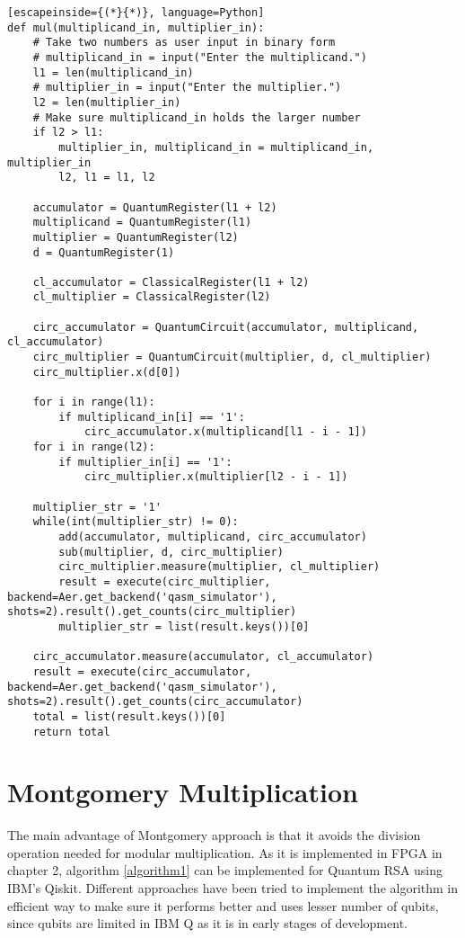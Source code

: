 \documentclass{cpp}
\begin{document}
\newpage
\begin{lstlisting}[escapeinside={(*}{*)}, language=Python]
def mul(multiplicand_in, multiplier_in):
    # Take two numbers as user input in binary form
    # multiplicand_in = input("Enter the multiplicand.")
    l1 = len(multiplicand_in)
    # multiplier_in = input("Enter the multiplier.")
    l2 = len(multiplier_in)
    # Make sure multiplicand_in holds the larger number
    if l2 > l1:
        multiplier_in, multiplicand_in = multiplicand_in, multiplier_in
        l2, l1 = l1, l2

    accumulator = QuantumRegister(l1 + l2)
    multiplicand = QuantumRegister(l1)
    multiplier = QuantumRegister(l2)
    d = QuantumRegister(1)
   
    cl_accumulator = ClassicalRegister(l1 + l2)
    cl_multiplier = ClassicalRegister(l2)
   
    circ_accumulator = QuantumCircuit(accumulator, multiplicand, cl_accumulator)
    circ_multiplier = QuantumCircuit(multiplier, d, cl_multiplier)
    circ_multiplier.x(d[0])
   
    for i in range(l1):
        if multiplicand_in[i] == '1':
            circ_accumulator.x(multiplicand[l1 - i - 1])
    for i in range(l2):
        if multiplier_in[i] == '1':
            circ_multiplier.x(multiplier[l2 - i - 1])
           
    multiplier_str = '1'
    while(int(multiplier_str) != 0):
        add(accumulator, multiplicand, circ_accumulator)
        sub(multiplier, d, circ_multiplier)
        circ_multiplier.measure(multiplier, cl_multiplier)
        result = execute(circ_multiplier, backend=Aer.get_backend('qasm_simulator'), shots=2).result().get_counts(circ_multiplier)
        multiplier_str = list(result.keys())[0]
   
    circ_accumulator.measure(accumulator, cl_accumulator)
    result = execute(circ_accumulator, backend=Aer.get_backend('qasm_simulator'), shots=2).result().get_counts(circ_accumulator)
    total = list(result.keys())[0]
    return total
\end{lstlisting}

\section{Montgomery Multiplication}	

The main advantage of Montgomery approach is that it avoids the division operation needed for modular multiplication\cite{alfred:paul:scott}. As it is implemented in FPGA in chapter 2, algorithm \ref{algorithm1} can be implemented for Quantum RSA using IBM's Qiskit. Different approaches have been tried to implement the algorithm in efficient way to make sure it performs better and uses lesser number of qubits, since qubits are limited in IBM Q as it is in early stages of development.
\end{document}
